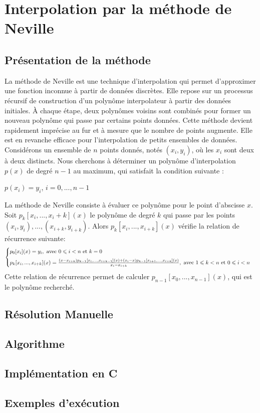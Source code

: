 \section{Interpolation par la méthode de Neville}
\subsection{Présentation de la méthode}
La méthode de Neville est une technique d'interpolation qui permet d'approximer une fonction inconnue à partir de données discrètes. Elle repose sur un processus récursif de construction d'un polynôme interpolateur à partir des données initiales. À chaque étape, deux polynômes voisins sont combinés pour former un nouveau polynôme qui passe par certains points données. Cette méthode devient rapidement imprécise au fur et à mesure que le nombre de points augmente. Elle est en revanche efficace pour l'interpolation de petits ensembles de données.\vspace{6pt}\\
Considérons un ensemble de $n$ points donnés, notés $(x_i, y_i)$, où les $x_i$ sont deux à deux distincts. Nous cherchons à déterminer un polynôme d'interpolation $p(x)$ de degré $n-1$ au maximum, qui satisfait la condition suivante :
\begin{center}
    $p(x_i)=y_i$,  $i=0, ..., n-1$
\end{center}
La méthode de Neville consiste à évaluer ce polynôme pour le point d'abscisse $x$.\\
Soit $p_k[x_i, ..., x_i+k](x)$ le polynôme de degré $k$ qui passe par les points $(x_i, y_i), ..., (x_{i+k}, y_{i+k})$. Alors $p_k[x_i, ..., x_{i+k}](x)$ vérifie la relation de récurrence suivante:\vspace{5pt}\\
\begin{equation*}
    \begin{cases}
        p_0[x_i](x)=y_i, \text{     avec  } 0\leqslant i< n \text{  et } k=0\vspace{6pt}\\
        p_k[x_i, ..., x_{i+k}](x)=\frac{(x-x_{i+k})p_{k-1}[x_i, ..., x_{i+k-1}](x)+(x_i-x)p_{k-1}[x_{i+1}, ..., x_{i+k}](x)}{x_i-x_{i+k}}, \text{     avec  } 1\leqslant k<n \text{ et } 0\leqslant i< n
    \end{cases}
\end{equation*}
Cette relation de récurrence permet de calculer $p_{n-1}[x_0, ..., x_{n-1}](x)$, qui est le polynôme recherché.
\subsection{Résolution Manuelle}
\subsection{Algorithme}
\subsection{Implémentation en C}
\subsection{Exemples d'exécution}